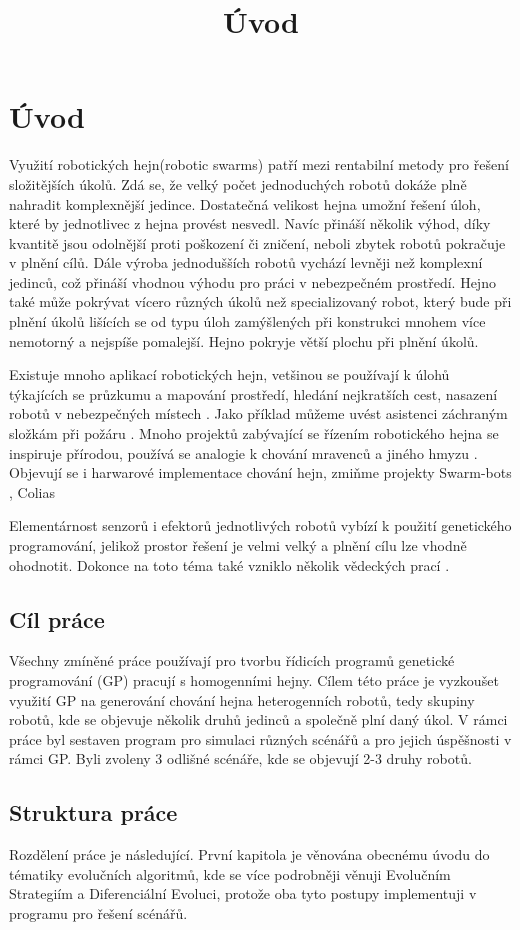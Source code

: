 \chapter*{Úvod}

\title{Úvod}
Využití robotických hejn(robotic swarms) patří mezi rentabilní metody pro řešení složitějších úkolů. Zdá se, že velký počet jednoduchých robotů dokáže plně nahradit komplexnější jedince. Dostatečná velikost hejna umožní řešení úloh, které by jednotlivec z hejna provést nesvedl. Navíc přináší několik výhod, díky kvantitě jsou odolnější proti poškození či zničení, neboli zbytek robotů pokračuje v plnění cílů. Dále výroba jednodušších robotů vychází levněji než komplexní jedinců, což přináší vhodnou výhodu pro práci v nebezpečném prostředí. Hejno také může pokrývat vícero různých úkolů než specializovaný robot, který bude při plnění úkolů lišících se od typu úloh zamýšlených při konstrukci mnohem více nemotorný a nejspíše pomalejší. Hejno pokryje větší plochu při plnění úkolů. 
\par
Existuje mnoho aplikací robotických hejn, vetšinou se používají k úlohů týkajících se průzkumu a mapování prostředí, hledání nejkratších cest, nasazení robotů v nebezpečných místech \citep{swarmApp}. Jako příklad můžeme uvést asistenci záchraným složkám při požáru \citep{fireRobots}. Mnoho projektů zabývající se řízením robotického hejna se inspiruje přírodou, používá se analogie k chování mravenců a jiného hmyzu \citep{PheroRobot}. Objevují se i harwarové implementace chování hejn, zmiňme projekty Swarm-bots \citep{swarmBots}, Colias \citep{Colias}  
\par 
Elementárnost senzorů i efektorů jednotlivých robotů vybízí k použití genetického programování, jelikož prostor řešení je velmi velký a plnění cílu lze vhodně ohodnotit. Dokonce na toto téma také vzniklo několik vědeckých prací \citep{ENovel} \citep{geneticSwarm}.
\section*{Cíl práce}
Všechny zmíněné práce používají pro tvorbu řídicích programů genetické programování (GP) pracují s homogenními hejny. Cílem této práce je vyzkoušet využití GP na generování chování hejna heterogenních robotů, tedy skupiny robotů, kde se objevuje několik druhů jedinců a společně plní daný úkol. V rámci práce byl sestaven program pro simulaci různých scénářů a pro jejich úspěšnosti v rámci GP. Byli zvoleny 3 odlišné scénáře, kde se objevují 2-3 druhy robotů.
\section*{Struktura práce}
Rozdělení práce je následující. První kapitola je věnována obecnému úvodu do tématiky evolučních algoritmů, kde se více podrobněji věnuji Evolučním Strategiím a Diferenciální Evoluci, protože oba tyto postupy implementuji v programu pro řešení scénářů. 